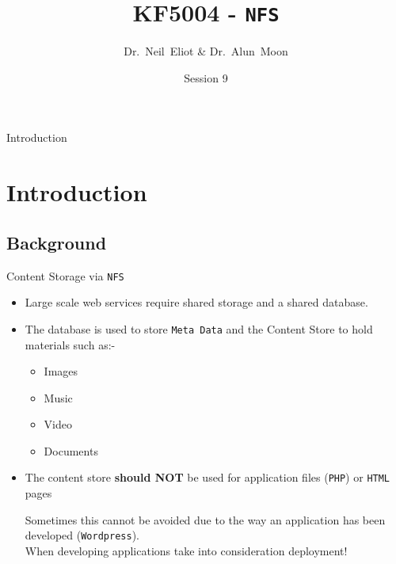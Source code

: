 \documentclass[xcolor=table,aspectratio=169]{beamer}
\title{KF5004 - \texttt{NFS}}
\author{Dr.~Neil~Eliot \& Dr.~Alun~Moon}
\institute[Northumbria University] %
{
  Department of Computer and Information Sciences\\
  University of Northumbria
}
\date{Session 9}
\begin{document}
\begin{frame}
  \titlepage
\end{frame}

\begin{frame}{Introduction}
  \tableofcontents
\end{frame}


\section{Introduction}
\subsection{Background}
\begin{frame}{Content Storage via \texttt{NFS}}
  \begin{itemize}
    \item Large scale web services require shared storage and a shared database.
    \item The database is used to store \texttt{Meta Data} and the Content Store to hold materials such as:-    
      \begin{itemize}
        \item Images
        \item Music
        \item Video
        \item Documents
      \end{itemize}
    \item The content store \textbf{should NOT} be used for application files (\texttt{PHP}) or \texttt{HTML} pages
      \begin{tcolorbox}
        \begin{center}
          \scriptsize Sometimes this cannot be avoided due to the way an application has been developed (\texttt{Wordpress}). \\When developing applications take into consideration deployment!
        \end{center}
      \end{tcolorbox}
  \end{itemize}
\end{frame}
\end{document}
